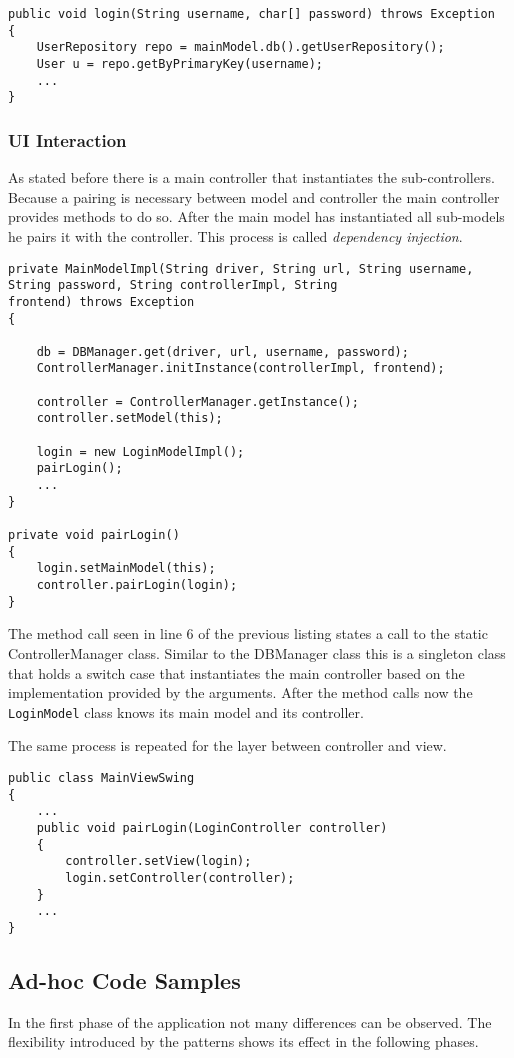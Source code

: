 \begin{lstlisting}
public void login(String username, char[] password) throws Exception
{
	UserRepository repo = mainModel.db().getUserRepository();
	User u = repo.getByPrimaryKey(username);
	...
}
\end{lstlisting}

\subsubsection{UI Interaction}
As stated before there is a main controller that instantiates the sub-controllers. Because a pairing is necessary between model and controller the main controller provides methods to do so. After the main model has instantiated all sub-models he pairs it with the controller. This process is called \emph{dependency injection}.

\begin{lstlisting}
private MainModelImpl(String driver, String url, String username, String password, String controllerImpl, String
frontend) throws Exception
{

	db = DBManager.get(driver, url, username, password);
	ControllerManager.initInstance(controllerImpl, frontend);
	
	controller = ControllerManager.getInstance();
	controller.setModel(this);
	
	login = new LoginModelImpl();
	pairLogin();
	...
}

private void pairLogin()
{
	login.setMainModel(this);
	controller.pairLogin(login);
}

\end{lstlisting}

The method call seen in line 6 of the previous listing states a call to the static ControllerManager class. Similar to the DBManager class this is a singleton class that holds a switch case that instantiates the main controller based on the implementation provided by the arguments. After the method calls now the \texttt{LoginModel} class knows its main model and its controller. 

The same process is repeated for the layer between controller and view. 

\begin{lstlisting}
public class MainViewSwing
{
	...
	public void pairLogin(LoginController controller)
	{
		controller.setView(login);
		login.setController(controller);
	}
	...
}
\end{lstlisting}
   

\subsection{Ad-hoc Code Samples}
In the first phase of the application not many differences can be observed. The flexibility introduced by the patterns shows its effect in the following phases. 

